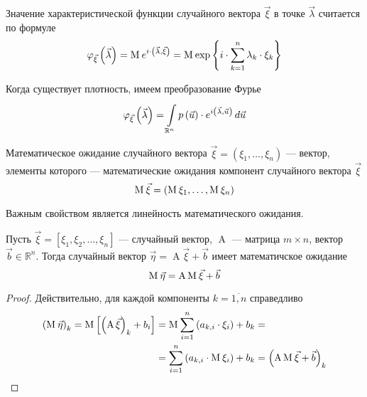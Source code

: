 \begin{definition}
  \label{def:characteristicFunction}
  Значение характеристической функции случайного вектора $\vec{\xi}$
  в точке $\vec{\lambda}$ считается по формуле
  $$\varphi_{\vec{\xi}}\left( \vec{\lambda} \right)
      = \mean{e^{i \cdot \left( \vec{\lambda}, \vec{\xi} \right)}}
      = \mean{
      \exp{\left\{ i \cdot \sum_{k=1}^n \lambda_k \cdot \xi_k \right\}}}$$

  Когда существует плотность, имеем преобразование Фурье
  $$\varphi_{\vec{\xi}}\left( \vec{\lambda} \right)
      = \integrall{\mathbb{R}^n}{d\vec{u}}{\pdf{\vec{u}} \cdot
      e^{i \left( \vec{\lambda}, \vec{u} \right)}}$$
\end{definition}

\begin{definition}
  Математическое ожидание случайного вектора
  $\vec{\xi} = \left( \xi_1, \dots, \xi_n \right)$ --- вектор,
  элементы которого --- математические ожидания компонент
  случайного вектора $\vec{\xi}$
  $$\mean{\vec{\xi}} = \left( \mean{\xi_1}, \dots, \mean{\xi_n} \right)$$
\end{definition}

Важным свойством является линейность математического ожидания.
\begin{affirmation}\label{af:mean:linearity}
  Пусть $\vec{\xi} = \left[ \xi_1, \xi_2, \dots, \xi_n \right]$ --- случайный
  вектор, $\operatorname{A}$ --- матрица $m \times n$,
  вектор $\vec{b} \in \mathbb{R}^n$.
  Тогда случайный вектор $\vec{\eta} = \operatorname{A}\vec{\xi} + \vec{b}$
  имеет математичское ожидание
  \begin{equation*}
    \mean{\vec{\eta}} = \operatorname{A} \mean{\vec{\xi}} + \vec{b}
  \end{equation*}
\end{affirmation}
\begin{proof}
  Действительно, для каждой компоненты $k = \overline{1, n}$
  справедливо
  \begin{equation*}
    \begin{split}
      \left( \mean{\vec{\eta}} \right)_k
      = \Mean{\left( \operatorname{A} \vec{\xi} \right)_k + b_i}
      &= \mean{\sum_{i=1}^{n} \left( a_{k,i} \cdot \xi_i \right)} + b_k = \\
      &= \sum_{i=1}^{n} \left( a_{k,i} \cdot \mean{\xi_i} \right) + b_k
      = \left( \operatorname{A} \mean{\vec{\xi}} + \vec{b} \right)_k
    \end{split}
  \end{equation*}
\end{proof}

